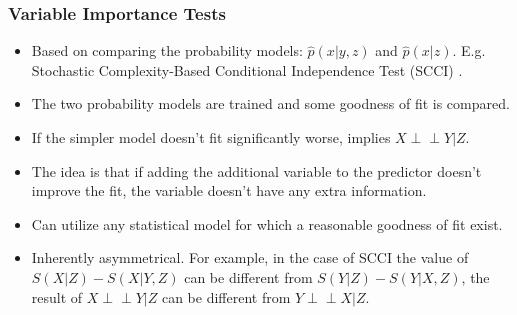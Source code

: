 \documentclass{beamer}
\def\ci{\perp\!\!\!\!\!\perp}
\begin{document}


\begin{frame}
	\frametitle{Variable Importance Tests}
	\begin{itemize}
		\setlength\itemsep{1em}
		\item Based on comparing the probability models: $\hat{p}(x |
			y, z) $ and $ \hat{p}(x | z) $. E.g. Stochastic
			Complexity-Based Conditional Independence Test (SCCI) \footnotemark.
		\item The two probability models are trained and some goodness of fit is compared.
		\item If the simpler model doesn't fit significantly worse, implies $ X \ci Y | Z $.
		\item The idea is that if adding the additional variable to the predictor doesn't improve the fit, the variable
			doesn't have any extra information.
		\item Can utilize any statistical model for which a reasonable goodness
			of fit exist.
		\item Inherently asymmetrical. For example, in the case of SCCI
			the value of $ S(X | Z) - S(X|Y,Z) $ can be different
			from $ S(Y|Z) - S(Y|X, Z) $, the result of $ X \ci Y |
			Z $ can be different from $ Y \ci X | Z $.
	\end{itemize}

\end{frame}
\end{document}
